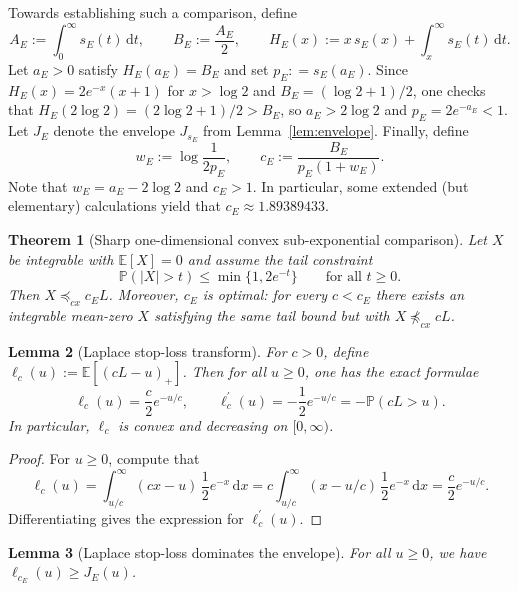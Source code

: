 \documentclass[11pt]{article}
\newcommand{\Pbb}{\mathbb{P}}
\newcommand{\Ebb}{\mathbb{E}}
\newtheorem{theorem}{Theorem}
\newtheorem{lemma}[theorem]{Lemma}
\begin{document}
Towards establishing such a comparison, define
%
\[
A_E := \int_0^\infty s_E(t) \, \mathrm{d}t, \qquad B_E :=\frac{A_E}{2}, \qquad
H_E(x) := x \, s_E (x) + \int_x^\infty s_E (t) \, \mathrm{d}t.
\]
%
Let $a_E>0$ satisfy $H_E (a_E) = B_E$ and set $p_E: = s_E (a_E)$. 
Since $H_E(x) = 2e^{-x}(x+1)$ for $x > \log 2$ and $B_E = (\log 2 + 1)/2$, one checks that $H_E(2\log 2) = (2\log 2 + 1)/2 > B_E$, so $a_E > 2\log 2$ and $p_E = 2e^{-a_E} < 1$. 
Let $J_E$ denote the envelope $J_{s_E}$ from Lemma~\ref{lem:envelope}. 
Finally, define
%
\begin{equation}\label{eq:psi1_constants}
w_E := \log\frac{1}{2 p_E},
\qquad
c_E := \frac{B_E}{p_E ( 1 + w_E)}.
\end{equation}
%
Note that $w_E = a_E - 2 \log 2$ and $c_E > 1$. In particular, some extended (but elementary) calculations yield that $c_E \approx 1.89389433$.

\begin{theorem}[Sharp one-dimensional convex sub-exponential comparison]\label{thm:psi1}
Let $X$ be integrable with $\Ebb [X] = 0$ and assume the tail constraint
%
\[
\Pbb(|X| > t) \le \min\{1, 2e^{-t}\} \qquad \text{for all }t\ge 0.
\]
%
Then $X \preceq_{cx} c_E L$. Moreover, $c_E$ is optimal: for every $c < c_E$ there exists an integrable mean-zero
$X$ satisfying the same tail bound but with $X \not \preceq_{cx} cL$.
\end{theorem}

\begin{lemma}[Laplace stop-loss transform] \label{lem:laplace_call}
For $c > 0$, define $\ell_c(u) := \Ebb[(c L - u)_+]$. Then for all $u \ge 0$, one has the exact formulae
%
\[
\ell_c(u) = \frac{c}{2} e^{-u/c},
\qquad
\ell_c^{\prime} (u) = - \frac12 e^{-u/c} = -\Pbb(cL>u).
\]
%
In particular, $\ell_c$ is convex and decreasing on $[0, \infty)$.
\end{lemma}

\begin{proof}
For $u\ge 0$, compute that
%
\[
\ell_c(u)
= \int_{u/c}^\infty (c x - u) \, \frac12 e^{-x} \, \mathrm{d}x
= c\int_{u/c}^\infty (x - u/c) \, \frac12 e^{-x} \, \mathrm{d}x
=\frac{c}{2} e^{-u/c}.
\]
%
Differentiating gives the expression for $\ell_c^{\prime}(u)$.
\end{proof}

\begin{lemma}[Laplace stop-loss dominates the envelope] \label{lem:laplace_ge_J}
For all $u \ge 0$, we have $\ell_{c_E} (u) \ge J_E (u)$.
\end{lemma}
\end{document}
